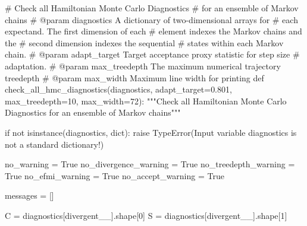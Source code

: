 \documentclass[
  letterpaper,
  DIV=11,
  numbers=noendperiod]{scrartcl}
\newenvironment{Shaded}{\begin{snugshade}}{\end{snugshade}}
\newcommand{\BuiltInTok}[1]{\textcolor[rgb]{0.00,0.23,0.31}{#1}}
\newcommand{\CommentTok}[1]{\textcolor[rgb]{0.37,0.37,0.37}{#1}}
\newcommand{\ControlFlowTok}[1]{\textcolor[rgb]{0.00,0.23,0.31}{#1}}
\newcommand{\DecValTok}[1]{\textcolor[rgb]{0.68,0.00,0.00}{#1}}
\newcommand{\FloatTok}[1]{\textcolor[rgb]{0.68,0.00,0.00}{#1}}
\newcommand{\KeywordTok}[1]{\textcolor[rgb]{0.00,0.23,0.31}{#1}}
\newcommand{\NormalTok}[1]{\textcolor[rgb]{0.00,0.23,0.31}{#1}}
\newcommand{\OperatorTok}[1]{\textcolor[rgb]{0.37,0.37,0.37}{#1}}
\newcommand{\PreprocessorTok}[1]{\textcolor[rgb]{0.68,0.00,0.00}{#1}}
\newcommand{\StringTok}[1]{\textcolor[rgb]{0.13,0.47,0.30}{#1}}
\newcommand{\VariableTok}[1]{\textcolor[rgb]{0.07,0.07,0.07}{#1}}
\begin{document}
\begin{Shaded}
\begin{Highlighting}[]
\CommentTok{\# Check all Hamiltonian Monte Carlo Diagnostics }
\CommentTok{\# for an ensemble of Markov chains}
\CommentTok{\# @param diagnostics A dictionary of two{-}dimensional arrays for }
\CommentTok{\#                    each expectand.  The first dimension of each}
\CommentTok{\#                    element indexes the Markov chains and the }
\CommentTok{\#                    second dimension indexes the sequential }
\CommentTok{\#                    states within each Markov chain.}
\CommentTok{\# @param adapt\_target Target acceptance proxy statistic for step size }
\CommentTok{\#                     adaptation.}
\CommentTok{\# @param max\_treedepth The maximum numerical trajectory treedepth}
\CommentTok{\# @param max\_width Maximum line width for printing}
\KeywordTok{def}\NormalTok{ check\_all\_hmc\_diagnostics(diagnostics,}
\NormalTok{                              adapt\_target}\OperatorTok{=}\FloatTok{0.801}\NormalTok{,}
\NormalTok{                              max\_treedepth}\OperatorTok{=}\DecValTok{10}\NormalTok{,}
\NormalTok{                              max\_width}\OperatorTok{=}\DecValTok{72}\NormalTok{):}
  \CommentTok{"""Check all Hamiltonian Monte Carlo Diagnostics for an }
\CommentTok{     ensemble of Markov chains"""}
     
  \ControlFlowTok{if} \KeywordTok{not} \BuiltInTok{isinstance}\NormalTok{(diagnostics, }\BuiltInTok{dict}\NormalTok{):}
    \ControlFlowTok{raise} \PreprocessorTok{TypeError}\NormalTok{(}\StringTok{\textquotesingle{}Input variable \textasciigrave{}diagnostics\textasciigrave{} is not a standard dictionary!\textquotesingle{}}\NormalTok{)}
  
\NormalTok{  no\_warning }\OperatorTok{=} \VariableTok{True}
\NormalTok{  no\_divergence\_warning }\OperatorTok{=} \VariableTok{True}
\NormalTok{  no\_treedepth\_warning }\OperatorTok{=} \VariableTok{True}
\NormalTok{  no\_efmi\_warning }\OperatorTok{=} \VariableTok{True}
\NormalTok{  no\_accept\_warning }\OperatorTok{=} \VariableTok{True}
  
\NormalTok{  messages }\OperatorTok{=}\NormalTok{ []}
  
\NormalTok{  C }\OperatorTok{=}\NormalTok{ diagnostics[}\StringTok{\textquotesingle{}divergent\_\_\textquotesingle{}}\NormalTok{].shape[}\DecValTok{0}\NormalTok{]}
\NormalTok{  S }\OperatorTok{=}\NormalTok{ diagnostics[}\StringTok{\textquotesingle{}divergent\_\_\textquotesingle{}}\NormalTok{].shape[}\DecValTok{1}\NormalTok{]}
  

\end{Highlighting}
\end{Shaded}
\end{document}
